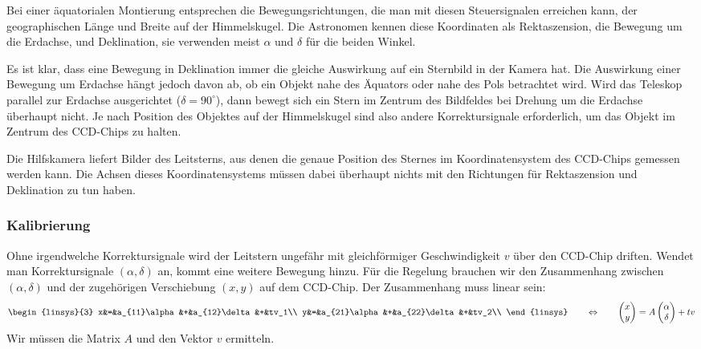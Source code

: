 Bei einer äquatorialen Montierung entsprechen die Bewegungsrichtungen,
die man mit diesen Steuersignalen erreichen kann, der geographischen
Länge und Breite auf der Himmelskugel. Die Astronomen kennen diese
Koordinaten als Rektaszension, die Bewegung um die Erdachse, und Deklination,
sie verwenden meist $\alpha$ und $\delta$ für die beiden Winkel.

Es ist klar, dass eine Bewegung in Deklination immer die gleiche Auswirkung
auf ein Sternbild in der Kamera hat.
Die Auswirkung einer Bewegung um Erdachse hängt jedoch
davon ab, ob ein Objekt nahe des Äquators oder nahe des Pols
betrachtet wird. Wird das Teleskop parallel zur Erdachse ausgerichtet
($\delta=90^\circ$), dann bewegt sich ein Stern im Zentrum des Bildfeldes
bei Drehung um die Erdachse überhaupt nicht.
Je nach Position des Objektes auf der Himmelskugel sind also andere
Korrektursignale erforderlich, um das Objekt im Zentrum des CCD-Chips
zu halten.

Die Hilfskamera liefert Bilder des Leitsterns, aus denen die genaue
Position des Sternes im Koordinatensystem des CCD-Chips gemessen
werden kann. Die Achsen dieses Koordinatensystems müssen dabei
überhaupt nichts mit den Richtungen für Rektaszension und Deklination
zu tun haben.

\subsubsection{Kalibrierung}
Ohne irgendwelche Korrektursignale wird der Leitstern ungefähr mit
gleichförmiger Geschwindigkeit $v$ über den CCD-Chip driften.
Wendet man Korrektursignale $(\alpha,\delta)$ an, kommt eine
weitere Bewegung hinzu. Für die Regelung brauchen wir den Zusammenhang
zwischen $(\alpha,\delta)$ und der zugehörigen Verschiebung $(x,y)$ auf dem
CCD-Chip. Der Zusammenhang muss linear sein:
\begin{equation}
\begin{linsys}{3}
x&=&a_{11}\alpha&+&a_{12}\delta&+&tv_1\\
y&=&a_{21}\alpha&+&a_{22}\delta&+&tv_2\\
\end{linsys}
\qquad
\Leftrightarrow
\qquad
\begin{pmatrix}x\\y\end{pmatrix}
=A\begin{pmatrix}\alpha\\\delta\end{pmatrix}+tv
\label{guiding:model}
\end{equation}
Wir müssen die Matrix $A$ und den Vektor $v$ ermitteln.

